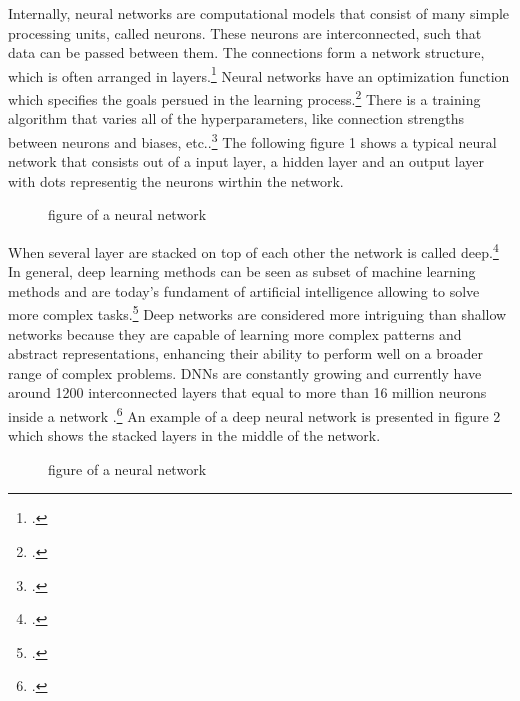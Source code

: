 Internally, neural networks are computational models that consist of many simple processing units, called neurons.
These neurons are interconnected, such that data can be passed between them.
The connections form a network structure, which is often arranged in layers.\footcite[cf.][305]{cichyDeepNeuralNetworks2019}
Neural networks have an optimization function which specifies the goals persued in the learning process.\footcite[cf.][1583]{durstewitzDeepNeuralNetworks2019}
There is a training algorithm that varies all of the hyperparameters, like connection strengths between neurons and biases, etc..\footcite[cf.][1583]{durstewitzDeepNeuralNetworks2019}
The following figure 1 shows a typical neural network that consists out of a input layer, a hidden layer and an output layer with dots representig the neurons wirthin the network.
\begin{figure}[H]
    \centering
    \caption{figure of a neural network}
\end{figure}
When several layer are stacked on top of each other the network is called deep.\footcite[cf.][305]{cichyDeepNeuralNetworks2019}
In general, deep learning methods can be seen as subset of machine learning methods and are today's fundament of artificial intelligence allowing to solve more complex tasks.\footcite[cf.][1583]{durstewitzDeepNeuralNetworks2019}
Deep networks are considered more intriguing than shallow networks because they are capable of learning more complex patterns and abstract representations, enhancing their ability to perform well on a broader range of complex problems.
\ac{DNN}s are constantly growing and currently have around 1200 interconnected layers that equal to more than 16 million neurons inside a network .\footcite[cf.][2]{mallComprehensiveReviewDeep2023}
An example of a deep neural network is presented in figure 2 which shows the stacked layers in the middle of the network.
\begin{figure}[H]
    \centering
    \caption{figure of a neural network}
\end{figure}

